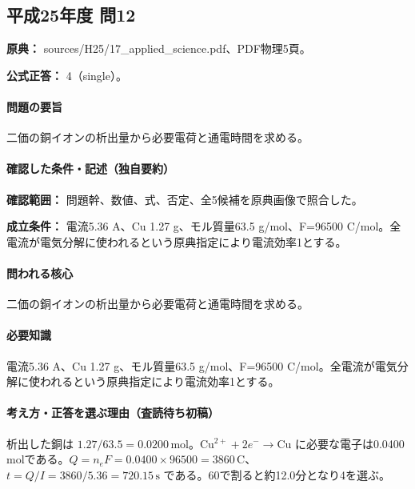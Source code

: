 \subsection{平成25年度 問12}
\label{q:h25-reg-applied-12}

\noindent\textbf{原典：} sources/H25/17\_applied\_science.pdf、PDF物理5頁。

\textbf{公式正答：} 4（single）。

\paragraph{問題の要旨} 二価の銅イオンの析出量から必要電荷と通電時間を求める。

\paragraph{確認した条件・記述（独自要約）}\mbox{}\par

\noindent\textbf{確認範囲：} 問題幹、数値、式、否定、全5候補を原典画像で照合した。\par

\noindent\textbf{成立条件：} 電流5.36 A、Cu 1.27 g、モル質量63.5 g/mol、F=\allowbreak{}96500 C/mol。全電流が電気分解に使われるという原典指定により電流効率1とする。\par

\paragraph{問われる核心} 二価の銅イオンの析出量から必要電荷と通電時間を求める。

\paragraph{必要知識} 電流5.36 A、Cu 1.27 g、モル質量63.5 g/mol、F=\allowbreak{}96500 C/mol。全電流が電気分解に使われるという原典指定により電流効率1とする。

\paragraph{考え方・正答を選ぶ理由（査読待ち初稿）} 析出した銅は \(1.27/63.5=0.0200\,\mathrm{mol}\)。\(\mathrm{Cu^{2+}}+2e^-\to\mathrm{Cu}\) に必要な電子は0.0400 molである。\(Q=n_eF=0.0400\times96500=3860\,\mathrm C\)、\(t=Q/I=3860/5.36=720.15\,\mathrm s\) である。60で割ると約12.0分となり4を選ぶ。

